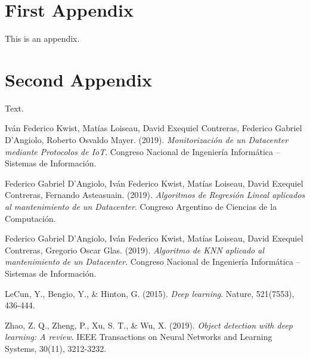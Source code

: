 \documentclass{article} %
\begin{document}
\clearpage

\appendix
\appendixpage
\addappheadtotoc

\section{First Appendix}\label{app:one}

This is an appendix.

\clearpage

\section{Second Appendix}\label{app:two}

Text.

\clearpage

\begin{thebibliography}{9}

Iván Federico Kwist, Matías Loiseau, David Exequiel Contreras, Federico Gabriel D’Angiolo, Roberto Osvaldo Mayer. (2019). \textit{Monitorización de un Datacenter mediante Protocolos de IoT}. Congreso Nacional de Ingeniería Informática – Sistemas de Información.

Federico Gabriel D’Angiolo, Iván Federico Kwist, Matías Loiseau, David Exequiel Contreras, Fernando Asteasuain. (2019). \textit{Algoritmos de Regresión Lineal aplicados al mantenimiento de un Datacenter}. Congreso Argentino de Ciencias de la Computación.

Federico Gabriel D’Angiolo, Iván Federico Kwist, Matías Loiseau, David Exequiel Contreras, Gregorio Oscar Glas. (2019). \textit{Algoritmo de KNN aplicado al mantenimiento de un Datacenter}. Congreso Nacional de Ingeniería Informática – Sistemas de Información.

LeCun, Y., Bengio, Y., \& Hinton, G. (2015). \textit{Deep learning}. Nature, 521(7553), 436-444.

Zhao, Z. Q., Zheng, P., Xu, S. T., \& Wu, X. (2019). \textit{Object detection with deep learning: A review}. IEEE Transactions on Neural Networks and Learning Systems, 30(11), 3212-3232.

\end{thebibliography}
\end{document}
